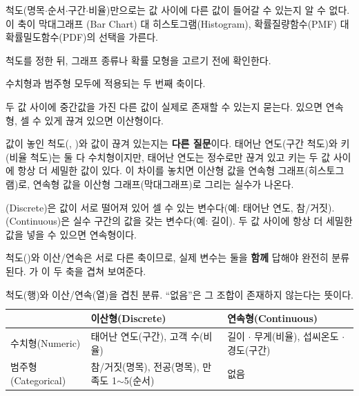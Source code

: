 \begin{inbrief}
  \item[Why] 척도(명목$\cdot$순서$\cdot$구간$\cdot$비율)만으로는 값 사이에
             다른 값이 들어갈 수 있는지 알 수 없다. 이 축이 막대그래프
             (Bar Chart) 대 히스토그램(Histogram), 확률질량함수(PMF)
             대 확률밀도함수(PDF)의 선택을 가른다.
  \item[When] 척도를 정한 뒤, 그래프 종류나 확률 모형을 고르기 전에
              확인한다.
  \item[Where] 수치형과 범주형 모두에 적용되는 두 번째 축이다.
  \item[How] 두 값 사이에 중간값을 가진 다른 값이 실제로 존재할 수
             있는지 묻는다. 있으면 연속형, 셀 수 있게 끊겨 있으면
             이산형이다.
\end{inbrief}

값이 놓인 척도(, )와
값이 끊겨 있는지는 \textbf{다른 질문}이다. 태어난 연도(구간 척도)와
키(비율 척도)는 둘 다 수치형이지만, 태어난 연도는 정수로만 끊겨 있고
키는 두 값 사이에 항상 더 세밀한 값이 있다. 이 차이를 놓치면 이산형
값을 연속형 그래프(히스토그램)로, 연속형 값을 이산형 그래프(막대그래프)로
그리는 실수가 나온다.

\begin{definition}
\label{def:discrete-continuous}
(Discrete)은 값이 서로 떨어져 있어 셀 수 있는 변수다(예:
태어난 연도, 참/거짓). (Continuous)은 실수 구간의 값을
갖는 변수다(예: 길이). 두 값 사이에 항상 더 세밀한 값을 넣을 수 있으면
연속형이다.
\end{definition}

척도()와 이산/연속은 서로 다른 축이므로, 실제 변수는
둘을 \textbf{함께} 답해야 완전히 분류된다. 가
이 두 축을 겹쳐 보여준다.

\begin{table}[H]\centering
\caption{척도(행)와 이산/연속(열)을 겹친 분류. ``없음''은 그 조합이
존재하지 않는다는 뜻이다.}
\label{tab:attr-discrete-2x2}
\begin{tabularx}{\linewidth}{@{}l X X@{}}
\toprule
 & 이산형(Discrete) & 연속형(Continuous) \\
\midrule
수치형(Numeric) & 태어난 연도(구간), 고객 수(비율)
  & 길이 $\cdot$ 무게(비율), 섭씨온도 $\cdot$ 경도(구간) \\
\midrule
범주형(Categorical) & 참/거짓(명목), 전공(명목), 만족도 1$\sim$5(순서)
  & 없음 \\
\bottomrule
\end{tabularx}
\end{table}


